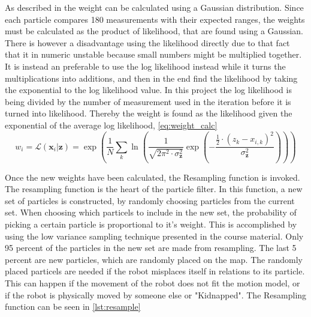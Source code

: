 \documentclass[Main]{subfiles}
\begin{document}
	As described in  the weight can be calculated using a Gaussian distribution.
	Since each particle compares 180 measurements with their expected ranges, the weights must be calculated as the product of likelihood, that are found using a Gaussian.
	There is however a disadvantage using the likelihood directly due to that fact that it in numeric unstable because small numbers might be multiplied together.
	It is instead an preferable to use the log likelihood instead while it turns the multiplications into additions, and then in the end find the likelihood by taking the exponential to the log likelihood value.
	In this project the log likelihood is being divided by the number of measurement used in the iteration before it is turned into likelihood.
	Thereby the weight is found as the likelihood given the exponential of the average log likelihood, \autoref{eq:weight_calc}	
	\begin{equation}
	\label{eq:weight_calc}
	w_i = \mathcal{L} (\mathbf{x}_i|\mathbf{z}) = \exp \left( \frac{1}{N} \displaystyle\sum_k \ln \left( \frac{1}{\sqrt{2\pi^2 \cdot \sigma_\mathbf{z}^2}} \exp \left( - \frac{\frac{1}{2}\cdot (z_k-x_{i,k})^2}{\sigma_\mathbf{z}^2} \right) \right) \right)
	\end{equation}
	
	Once the new weights have been calculated, the Resampling function is invoked. 
	The resampling function is the heart of the particle filter.
	In this function, a new set of particles is constructed, by randomly choosing particles from the current set.
	When choosing which particels to include in the new set, the probability of picking a certain particle is proportional to it's weight.
	This is accomplished by using the low variance sampling technique presented in the course material.
	Only 95 percent of the particles in the new set are made from resampling.
	The last 5 percent are new particles, which are randomly placed on the map.
	The randomly placed particels are needed if the robot misplaces itself in relations to its particle.
	This can happen if the movement of the robot does not fit the motion model, or if the robot is physically moved by someone else or "Kidnapped". 
	The Resampling function can be seen in \autoref{lst:resample}
	
\end{document}
